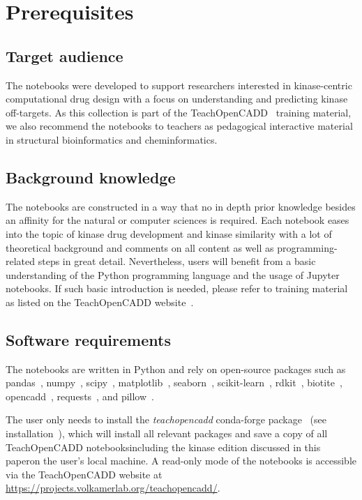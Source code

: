 \documentclass[9pt,training]{livecoms}
\begin{document}
\section{Prerequisites}
\subsection{Target audience}
The notebooks were developed to support researchers interested in kinase-centric computational drug design with a focus on understanding and predicting kinase off-targets. 
As this collection is part of the TeachOpenCADD~\cite{Sydow_2019_JCheminform, Sydow_2021_toc_chemrxiv} training material, we also recommend the notebooks to teachers as pedagogical interactive material in structural bioinformatics and cheminformatics.

\subsection{Background knowledge}
The notebooks are constructed in a way that no in depth prior knowledge besides an affinity for the natural or computer sciences is required. Each notebook eases into the topic of kinase drug development and kinase similarity with a lot of theoretical background and comments on all content as well as programming-related steps in great detail. Nevertheless, users will benefit from a basic understanding of the Python programming language and the usage of Jupyter notebooks. If such basic introduction is needed, please refer to training material as listed on the TeachOpenCADD website~\cite{toc_python_2022}.

\subsection{Software requirements}
The notebooks are written in Python and rely on open-source packages such as pandas~\cite{pandas_2020}, numpy~\cite{harris_2020_numpy}, scipy~\cite{Virtanen_2020_NMeth}, matplotlib~\cite{Hunter_2007_IEEE}, seaborn~\cite{Waskom_2021_seaborn}, scikit-learn~\cite{Pedregosa_2011_JMLR}, rdkit~\cite{RDKit_2022}, biotite~\cite{Kunzmann_2018_biotite}, opencadd~\cite{Sydow_2022_JOSS}, requests~\cite{requests_2022}, and pillow~\cite{pillow_2022}.

The user only needs to install the \textit{teachopencadd} conda-forge package~\cite{toc_conda_forge_2022} (see installation~\cite{toc_website_installing}), which will install all relevant packages and save a copy of all TeachOpenCADD notebooks\textemdash including the kinase edition discussed in this paper\textemdash on the user's local machine. A read-only mode of the notebooks is accessible via the TeachOpenCADD website at \href{https://projects.volkamerlab.org/teachopencadd/}{https://projects.volkamerlab.org/teachopencadd/}.
\end{document}
